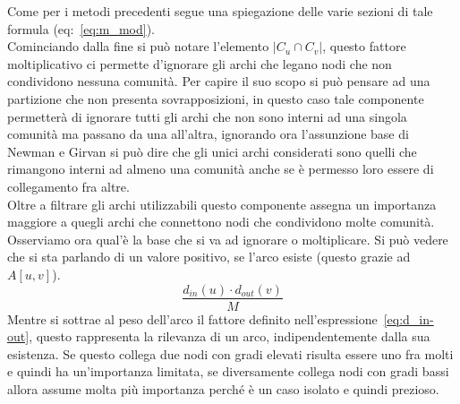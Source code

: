 Come per i metodi precedenti segue una spiegazione delle varie sezioni di tale formula (eq:~\ref{eq:m_mod}).\\
Cominciando dalla fine si può notare l'elemento $\displaystyle |C_u \cap C_v|$, questo fattore moltiplicativo ci permette d'ignorare gli archi che legano nodi che non condividono nessuna comunità. Per capire il suo scopo si può pensare ad una partizione che non presenta sovrapposizioni, in questo caso tale componente permetterà di ignorare tutti gli archi che non sono interni ad una singola comunità ma passano da una all'altra, ignorando ora l'assunzione base di Newman e Girvan si può dire che gli unici archi considerati sono quelli che rimangono interni ad almeno una comunità anche se è permesso loro essere di collegamento fra altre.\\
Oltre a filtrare gli archi utilizzabili questo componente assegna un importanza maggiore a quegli archi che connettono nodi che condividono molte comunità.\\
Osserviamo ora qual'è la base che si va ad ignorare o moltiplicare. Si può vedere che si sta parlando di un valore positivo, se l'arco esiste (questo grazie ad $\displaystyle A \left[ u,v \right]$). 
\begin{equation}
	\frac{ d_{in}\left(u\right) \cdot d_{out}\left(v\right) }{M}
	\label{eq:d_in-out}
\end{equation}
Mentre si sottrae al peso dell'arco il fattore definito nell'espressione~\ref{eq:d_in-out}, questo rappresenta la rilevanza di un arco, indipendentemente dalla sua esistenza. Se questo collega due nodi con gradi elevati risulta essere uno fra molti e quindi ha un'importanza limitata, se diversamente collega nodi con gradi bassi allora assume molta più importanza perché è un caso isolato e quindi prezioso.
%
%
%
%
%
